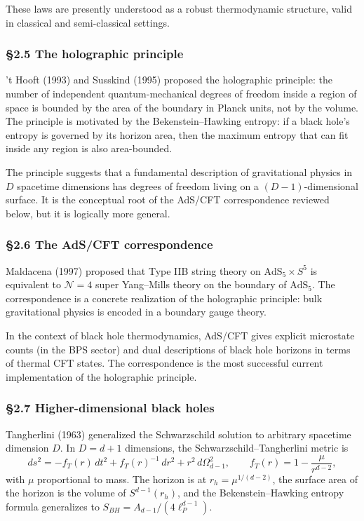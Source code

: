 \documentclass[a4paper,11pt]{article}
\theoremstyle{definition}
\begin{document}
These laws are presently understood as a robust thermodynamic structure,
valid in classical and semi-classical settings.

\subsubsection{§2.5 The holographic
principle}\label{the-holographic-principle}

't Hooft (1993) and Susskind (1995) proposed the holographic principle:
the number of independent quantum-mechanical degrees of freedom inside a
region of space is bounded by the area of the boundary in Planck units,
not by the volume. The principle is motivated by the Bekenstein--Hawking
entropy: if a black hole's entropy is governed by its horizon area, then
the maximum entropy that can fit inside any region is also area-bounded.

The principle suggests that a fundamental description of gravitational
physics in \(D\) spacetime dimensions has degrees of freedom living on a
\((D-1)\)-dimensional surface. It is the conceptual root of the AdS/CFT
correspondence reviewed below, but it is logically more general.

\subsubsection{§2.6 The AdS/CFT
correspondence}\label{the-adscft-correspondence}

Maldacena (1997) proposed that Type IIB string theory on
\(\mathrm{AdS}_5 \times S^5\) is equivalent to \(\mathcal{N} = 4\) super
Yang--Mills theory on the boundary of \(\mathrm{AdS}_5\). The
correspondence is a concrete realization of the holographic principle:
bulk gravitational physics is encoded in a boundary gauge theory.

In the context of black hole thermodynamics, AdS/CFT gives explicit
microstate counts (in the BPS sector) and dual descriptions of black
hole horizons in terms of thermal CFT states. The correspondence is the
most successful current implementation of the holographic principle.

\subsubsection{§2.7 Higher-dimensional black
holes}\label{higher-dimensional-black-holes}

Tangherlini (1963) generalized the Schwarzschild solution to arbitrary
spacetime dimension \(D\). In \(D = d + 1\) dimensions, the
Schwarzschild--Tangherlini metric is
\[ds^2 = -f_T(r)\, dt^2 + f_T(r)^{-1}\, dr^2 + r^2\, d\Omega_{d-1}^2, \qquad f_T(r) = 1 - \frac{\mu}{r^{d-2}},\]
with \(\mu\) proportional to mass. The horizon is at
\(r_h = \mu^{1/(d-2)}\), the surface area of the horizon is the volume
of \(S^{d-1}(r_h)\), and the Bekenstein--Hawking entropy formula
generalizes to \(S_{BH} = A_{d-1}/(4\ell_P^{d-1})\).
\end{document}
